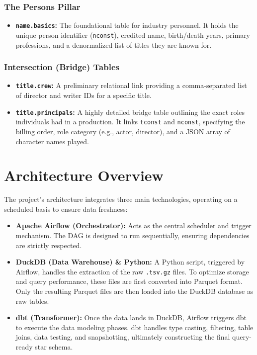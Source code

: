 \documentclass[runningheads]{llncs}
\begin{document}
\subsubsection*{The Persons Pillar}
\begin{itemize}
    \item \textbf{\texttt{name.basics}:} The foundational table for industry personnel. It holds the unique person identifier (\texttt{nconst}), credited name, birth/death years, primary professions, and a denormalized list of titles they are known for.
\end{itemize}

\subsubsection*{Intersection (Bridge) Tables}
\begin{itemize}
    \item \textbf{\texttt{title.crew}:} A preliminary relational link providing a comma-separated list of director and writer IDs for a specific title.
    \item \textbf{\texttt{title.principals}:} A highly detailed bridge table outlining the exact roles individuals had in a production. It links \texttt{tconst} and \texttt{nconst}, specifying the billing order, role category (e.g., actor, director), and a JSON array of character names played.
\end{itemize}

\section{Architecture Overview}
The project's architecture integrates three main technologies, operating on a scheduled basis to ensure data freshness:

\begin{itemize}
    \item \textbf{Apache Airflow (Orchestrator):} Acts as the central scheduler and trigger mechanism. The DAG is designed to run sequentially, ensuring dependencies are strictly respected.
    \item \textbf{DuckDB (Data Warehouse) \& Python:} A Python script, triggered by Airflow, handles the extraction of the raw \texttt{.tsv.gz} files. To optimize storage and query performance, these files are first converted into Parquet format. Only the resulting Parquet files are then loaded into the DuckDB database as raw tables.
    \item \textbf{dbt (Transformer):} Once the data lands in DuckDB, Airflow triggers dbt to execute the data modeling phases. dbt handles type casting, filtering, table joins, data testing, and snapshotting, ultimately constructing the final query-ready star schema.
\end{itemize}
\end{document}
